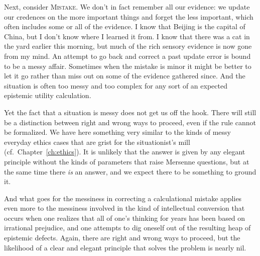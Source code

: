 Next, consider \textsc{Mistake}. We don't in fact remember all our evidence:
we update our credences on the more important things and forget the less important, which often includes some or
all of the evidence. I know that Beijing is the capital of China, but I don't know where I learned it from. I know that 
there was a cat in the yard earlier this morning, but much of the rich sensory evidence is now gone from my mind. 
An attempt to go back and correct a past update error is bound to be a messy affair. Sometimes when the mistake is minor
it might be better to let it go rather than miss out on some of the evidence gathered since. And the situation is often
too messy and too complex for any sort of an expected epistemic utility calculation. 

Yet the fact that a situation is messy does not get us off the hook. There will still
be a distinction between right and wrong ways to proceed, even if the rule cannot be formalized. We have here something very
similar to the kinds of messy everyday ethics cases that are grist for the situationist's mill (cf.\ Chapter~\ref{ch:ethics}).
It is unlikely that the answer is given by any elegant principle without the kinds of parameters that raise Mersenne
questions, but at the same time there \textit{is} an answer, and we expect there to be something to ground it.

And what goes for the messiness in correcting a calculational mistake applies even more to the messiness involved in
the kind of intellectual conversion that occurs when one realizes that all of one's thinking for years has been based
on irrational prejudice, and one attempts to dig oneself out of the resulting heap of epistemic defects. Again, there
are right and wrong ways to proceed, but the likelihood of a clear and elegant principle that solves the problem is
nearly nil. 

